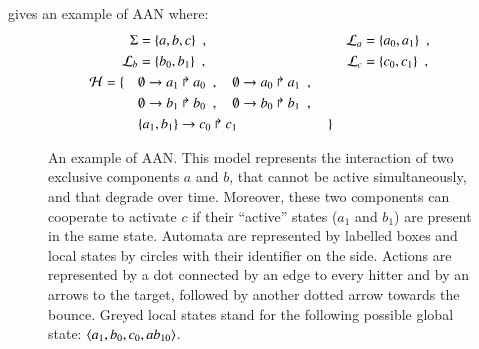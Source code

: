 \begin{example}
   gives an example of AAN where:
  \begin{align*}
    \Sigma &= \{ a, b, c \} \enspace,
      & \mathcal{L}_a &= \{ a_0, a_1 \} \enspace, \\
    \mathcal{L}_b &= \{ b_0, b_1 \} \enspace,
      & \mathcal{L}_c &= \{ c_0, c_1 \} \enspace, \\
    \mathcal{H} = \{ \quad
      & \emptyset\rightarrow a_1\Rsh a_0 \enspace , \quad
        \emptyset\rightarrow a_0\Rsh a_1 \enspace , \\
      & \emptyset\rightarrow b_1\Rsh b_0 \enspace , \quad
        \emptyset\rightarrow b_0\Rsh b_1 \enspace , \\
      & \{a_1, b_1\}\rightarrow c_0\Rsh c_1 \enspace \quad \qquad \qquad
      \quad \}
  \end{align*}

\begin{figure}[tb]
  \centering
  \caption{%
  \label{fig:ph-livelock}%
    An example of AAN.
    This model represents the interaction of two exclusive components $a$ and $b$,
    that cannot be active simultaneously, and that degrade over time.
    Moreover, these two components can cooperate to activate $c$
    if their “active” states ($a_1$ and $b_1$)
    are present in the same state.
    Automata are represented by labelled boxes
    and local states by circles with their identifier on the side.
    Actions are represented by a dot connected by an edge to every hitter
    and by an arrows to the target, followed by another dotted arrow towards the bounce.
    Greyed local states stand for the following possible global state:
    $\mbox{$\langle a_1, b_0, c_0, ab_{10} \rangle$}$.
  }
\end{figure}

\end{example}


